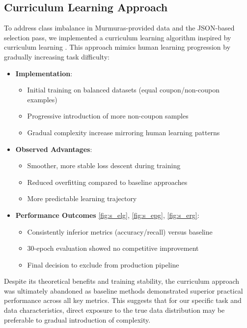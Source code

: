 \documentclass[licencjacka,en]{pracamgr}
\let\cleardoublepage\clearpage
\begin{document}
\let\cleardoublepage\clearpage
\begin{appendices}
\chapter{Curriculum Learning Approach} \label{AppA}

To address class imbalance in Murmuras-provided data and the JSON-based selection pass, we implemented a curriculum learning algorithm inspired by curriculum learning \cite{CurrLearn}. This approach mimics human learning progression by gradually increasing task difficulty:

\begin{itemize}
    \item \textbf{Implementation}:
    \begin{itemize}
        \item Initial training on balanced datasets (equal coupon/non-coupon examples)
        \item Progressive introduction of more non-coupon samples
        \item Gradual complexity increase mirroring human learning patterns
    \end{itemize}

    \item \textbf{Observed Advantages}:
    \begin{itemize}
        \item Smoother, more stable loss descent during training
        \item Reduced overfitting compared to baseline approaches
        \item More predictable learning trajectory
    \end{itemize}

    \item \textbf{Performance Outcomes} \ref{fig:s_elg}, \ref{fig:s_epg}, \ref{fig:s_erg}:
    \begin{itemize}
        \item Consistently inferior metrics (accuracy/recall) versus baseline
        \item 30-epoch evaluation showed no competitive improvement
        \item Final decision to exclude from production pipeline
    \end{itemize}
\end{itemize}

Despite its theoretical benefits and training stability, the curriculum approach was ultimately abandoned as baseline methods demonstrated superior practical performance across all key metrics. This suggests that for our specific task and data characteristics, direct exposure to the true data distribution may be preferable to gradual introduction of complexity.


\end{appendices}
\end{document}
